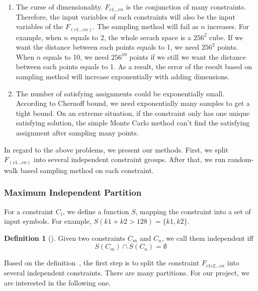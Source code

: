 \begin{enumerate}
      \item The curse of dimensionality. $F_{c1...cn}$ is the conjunction of many
      constraints. Therefore, the input variables of each constraints will also be 
      the input variables of the $F_(c1...cn)$. The sampling method will fail as 
      $n$ increases. For example, when $n$ equals to 2, the whole serach space is 
      a $256^2$ cube. If we want the distance between each points equals to 1,
      we need $256^2$ points. When $n$ equals to 10, we need $256^{10}$ points if we 
      still we want the distance between each points equals to 1. As a result, the 
      error of the result based on sampling method will increase exponentially with
      adding dimensions. 

      \item The number of satisfying assignments could be exponentially small.
      According to Chernoff bound, we need exponentially many samples to get 
      a tight bound. On an extreme situation, if the constraint only has one unique
      satisfying solution, the simple Monte Carlo method can't find the satisfying
      assignment after sampling many points.
\end{enumerate}

In regard to the above problems, we present our methods. First, we split 
$F_(c1...cn)$ into several independent constraint groups. After
that, we run random-walk based sampling method on each constraint.

\subsubsection{Maximum Independent Partition}

For a constraint $C_i$, we define a function $S$, mapping
the constraint into a set of input symbols. For example, 
$S(k1 + k2 > 128) = \{k1, k2\}$.

\theoremstyle{definition}
\newtheorem{definition}{Definition}[section]

\begin{definition}[]
      \label{independentC}
      Given two constraints $C_m$ and $C_n$, we call them independent iff 
      $$S(C_m) \cap S(C_n) = \emptyset$$
\end{definition}

Based on the definition~\label{independentC}, the first step is to split
the constraint $F_{c1c2...cn}$ into several independent constraints. There
are many partitions. For our project, we are interested in the following
one.

